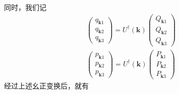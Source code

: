 同时，我们记
\begin{equation}
    \begin{aligned} 
    \left(\begin{array}{c}
         q_{\mathbf{k}1 } \\
         q_{\mathbf{k}2 } \\
         q_{\mathbf{k}3 } 
         \end{array}\right) = U^\dagger (\mathbf{k} ) \left(\begin{array}{c}
            Q_{\mathbf{k}1 } \\
            Q_{\mathbf{k}2 } \\
            Q_{\mathbf{k}3 } 
            \end{array}\right) \\
            \left(\begin{array}{c}
                p_{\mathbf{k}1 } \\
                p_{\mathbf{k}2 } \\
                p_{\mathbf{k}3 } 
                \end{array}\right) = U^\dagger (\mathbf{k} ) \left(\begin{array}{c}
                   P_{\mathbf{k}1 } \\
                   P_{\mathbf{k}2 } \\
                   P_{\mathbf{k}3 } 
                   \end{array}\right)
    \end{aligned}  
\end{equation}
经过上述幺正变换后，就有
